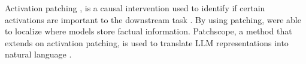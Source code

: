 
Activation patching \cite{heimersheim2024use}, is a causal intervention used to identify if certain activations are important to the downstream task \cite{vig2020investigating}. By using patching, \citet{meng2022locating} were able to localize where models store factual information.
Patchscope, a method that extends on activation patching, is used to translate LLM representations into natural language \cite{patchscopes}. 


